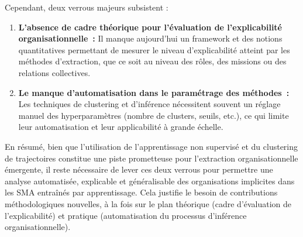 Cependant, deux verrous majeurs subsistent :
\begin{enumerate}
  \item \textbf{L’absence de cadre théorique pour l’évaluation de l’explicabilité organisationnelle~:} Il manque aujourd’hui un framework et des notions quantitatives permettant de mesurer le niveau d’explicabilité atteint par les méthodes d’extraction, que ce soit au niveau des rôles, des missions ou des relations collectives.
  \item \textbf{Le manque d’automatisation dans le paramétrage des méthodes~:} Les techniques de clustering et d’inférence nécessitent souvent un réglage manuel des hyperparamètres (nombre de clusters, seuils, etc.), ce qui limite leur automatisation et leur applicabilité à grande échelle.
\end{enumerate}

En résumé, bien que l’utilisation de l’apprentissage non supervisé et du clustering de trajectoires constitue une piste prometteuse pour l’extraction organisationnelle émergente, il reste nécessaire de lever ces deux verrous pour permettre une analyse automatisée, explicable et généralisable des organisations implicites dans les SMA entraînés par apprentissage. Cela justifie le besoin de contributions méthodologiques nouvelles, à la fois sur le plan théorique (cadre d’évaluation de l’explicabilité) et pratique (automatisation du processus d’inférence organisationnelle).




